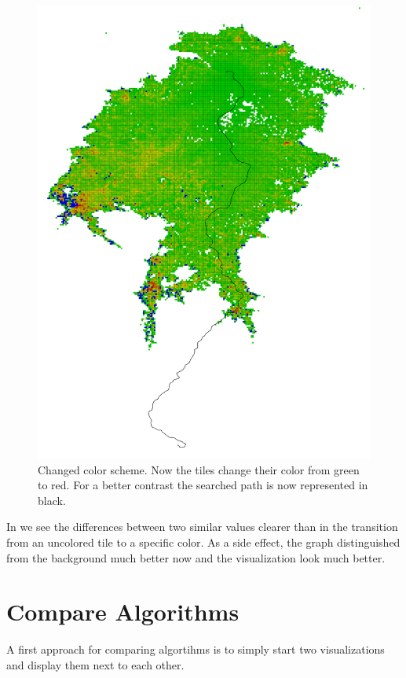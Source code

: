 \documentclass
[
    paper = a4,
    pagesize,
    12 pt,
    oneside,                       %
    open = right,
    DIV = calc,
    BCOR = 0 mm,                   %
    bibtotoc
]
{scrbook}
\begin{document}
\begin{figure}
    \includegraphics[width=\textwidth]{Images/vis-hsv-cache.png}
\caption[]{Changed color scheme. Now the tiles change their color from green to red. For a better contrast the searched path is now represented in black.}
\label{fig:reload_coloring_hsv}
\end{figure}

In  we see the differences between two similar values clearer than in the transition from an uncolored tile to a specific color.
As a side effect, the graph distinguished from the background much better now and the visualization look much better.

\section{Compare Algorithms} \label{compare}
A first approach for comparing algortihms is to simply start two visualizations and display them next to each other.
\end{document}
